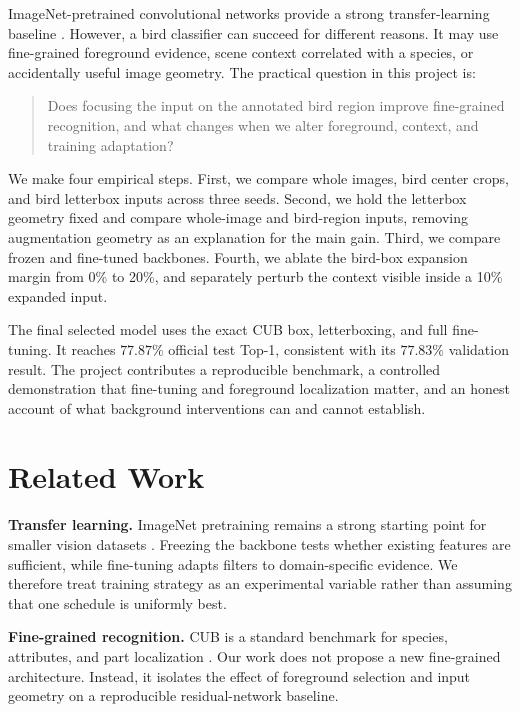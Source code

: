 \documentclass[10pt,twocolumn,letterpaper]{article}
\begin{document}
ImageNet-pretrained convolutional networks provide a strong transfer-learning
baseline \cite{deng2009imagenet,he2016resnet}. However, a bird classifier can
succeed for different reasons. It may use fine-grained foreground evidence,
scene context correlated with a species, or accidentally useful image
geometry. The practical question in this project is:

\begin{quote}
Does focusing the input on the annotated bird region improve fine-grained
recognition, and what changes when we alter foreground, context, and training
adaptation?
\end{quote}

We make four empirical steps. First, we compare whole images, bird center
crops, and bird letterbox inputs across three seeds. Second, we hold the
letterbox geometry fixed and compare whole-image and bird-region inputs,
removing augmentation geometry as an explanation for the main gain. Third, we
compare frozen and fine-tuned backbones. Fourth, we ablate the bird-box
expansion margin from 0\% to 20\%, and separately perturb the context visible
inside a 10\% expanded input.

The final selected model uses the exact CUB box, letterboxing, and full
fine-tuning. It reaches $77.87\%$ official test Top-1, consistent with its
$77.83\%$ validation result. The project contributes a reproducible
benchmark, a controlled demonstration that fine-tuning and foreground
localization matter, and an honest account of what background interventions
can and cannot establish.

\section{Related Work}

\textbf{Transfer learning.} ImageNet pretraining remains a strong starting
point for smaller vision datasets \cite{deng2009imagenet}. Freezing the
backbone tests whether existing features are sufficient, while fine-tuning
adapts filters to domain-specific evidence. We therefore treat training
strategy as an experimental variable rather than assuming that one schedule
is uniformly best.

\textbf{Fine-grained recognition.} CUB is a standard benchmark for species,
attributes, and part localization \cite{wah2011cub}. Our work does not
propose a new fine-grained architecture. Instead, it isolates the effect of
foreground selection and input geometry on a reproducible residual-network
baseline.
\end{document}
